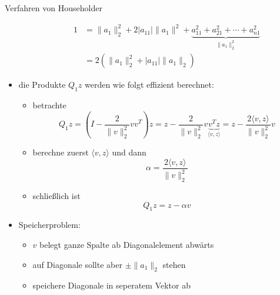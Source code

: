 \begin{defi}{Verfahren von Householder}
\begin{itemize}
\begin{itemize}
\begin{alignat*}{1}
                                      & = \|a_1\|_2^2 + 2 |a_{11}| \|a_1\|^2 + \underbrace{a_{11}^2 + a_{21}^2 + \cdots + a_{n1}^2}_{\|a_1\|_2^2} \\ 
                                      & = 2 (\|a_1\|_2^2 + |a_{11}| \|a_1\|_2)
                        \end{alignat*}
              \end{itemize}
        \item die Produkte $Q_1z$ werden wie folgt effizient berechnet:
              \begin{itemize}
                  \item betrachte
                        \[
                            Q_1z = \left( I - \frac{2}{\|v\|_2^2} vv^T \right) z = z - \frac{2}{\|v\|_2^2} v \underbrace{v^Tz}_{\langle v, z \rangle} = z - \frac{2 \langle v, z \rangle}{\|v\|_2^2} v
                        \]
                  \item berechne zuerst $\langle v, z \rangle$ und dann
                        \[ 
                            \alpha = \frac{2 \langle v, z \rangle}{\|v\|_2^2}
                        \]
                  \item schließlich ist
                        \[ 
                            Q_1 z = z - \alpha v
                        \]
              \end{itemize}
        \item Speicherproblem:
              \begin{itemize}
                  \item $v$ belegt ganze Spalte ab Diagonalelement abwärts
                  \item auf Diagonale sollte aber $\pm \|a_1\|_2$ stehen
                  \item speichere Diagonale in seperatem Vektor ab
              \end{itemize}
    \end{itemize}
\end{defi}

